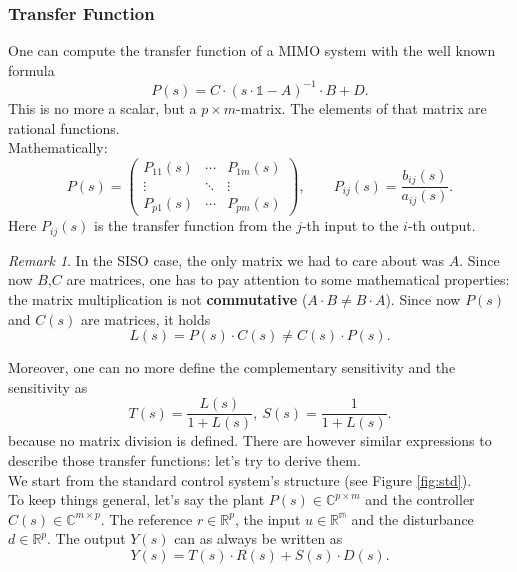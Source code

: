 \documentclass[a4paper,12 pt]{article}
\numberwithin{equation}{section}
\theoremstyle{definition}
\theoremstyle{remark}
\newtheorem*{bmk}{Remark}
\theoremstyle{definition}
\theoremstyle{definition}
\theoremstyle{definition}
\theoremstyle{remark}
\begin{document}
\subsubsection{Transfer Function}
One can compute the transfer function of a MIMO system with the well known formula
\begin{equation}
P(s)=C\cdot (s\cdot \mathbb{1}-A)^{-1}\cdot B+D.
\end{equation}
This is no more a scalar, but a $p\times m$-matrix. The elements of that matrix are rational functions. \\ Mathematically:
\begin{equation}
P(s)=\begin{pmatrix} P_{11}(s) & \cdots & P_{1m}(s) \\ \vdots & \ddots & \vdots \\ P_{p1}(s) & \cdots & P_{pm}(s)
\end{pmatrix}, \qquad P_{ij}(s)=\frac{b_{ij}(s)}{a_{ij}(s)}.
\end{equation}
Here $P_{ij}(s)$ is the transfer function from the $j$-th input to the $i$-th output.
\begin{bmk}
In the SISO case, the only matrix we had to care about was $A$. Since now $B$,$C$ are matrices, one has to pay attention to some mathematical properties: the matrix multiplication is not \textbf{commutative} ($A\cdot B \neq B\cdot A$). Since now $P(s)$ and $C(s)$ are matrices, it holds
\begin{equation}
L(s)=P(s)\cdot C(s)\neq C(s)\cdot P(s).
\end{equation}
\end{bmk}
Moreover, one can no more define the complementary sensitivity and the sensitivity as
\begin{equation}
T(s)=\frac{L(s)}{1+L(s)}, \ S(s)=\frac{1}{1+L(s)}.
\end{equation}
because no matrix division is defined. 
There are however similar expressions to describe those transfer functions: let's try to derive them.\\
We start from the standard control system's structure (see Figure \ref{fig:std}). \\
To keep things general, let's say the plant $P(s) \in \mathbb{C}^{p\times m}$ and the controller $C(s) \in \mathbb{C}^{m\times p}$. The reference $r\in \mathbb{R}^p$, the input $u \in \mathbb{R^m}$ and the disturbance $d \in \mathbb{R}^p$. The output $Y(s)$ can as always be written as
\begin{equation}
Y(s)=T(s)\cdot R(s)+ S(s)\cdot D(s).
\label{eq:gen}
\end{equation}
\end{document}
